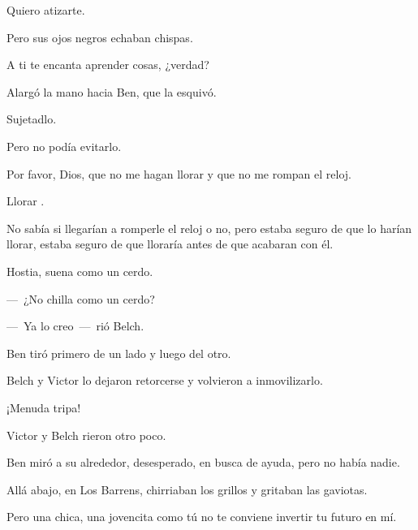 \sk
Quiero atizarte. 

\sk
Pero sus ojos negros echaban chispas.

\sk
A ti te encanta aprender cosas, ¿verdad?

\sk
Alargó la mano hacia Ben, que la esquivó.

\sk
Sujetadlo.

\sk
Pero no podía evitarlo. 

\sk
Por favor, Dios,
que no me hagan llorar y que no me rompan el
reloj.

\sk
Llorar .

\sk
No sabía si
llegarían a romperle el reloj o no, pero estaba
seguro de que lo harían llorar, estaba seguro de
que lloraría  antes de que acabaran con él.

\sk
Hostia, suena como un cerdo. 

\sk
---~¿No chilla como un cerdo?

---~Ya lo creo~---~rió Belch.



\sk
Ben tiró primero de un lado y luego del otro.

\sk
Belch y Victor lo dejaron retorcerse y volvieron a
inmovilizarlo.
\nb{}

\sk
¡Menuda tripa! 

\sk
Victor y Belch rieron otro poco.

\sk
Ben miró a su
alrededor, desesperado, en busca de ayuda, pero
no había nadie.

\sk
Allá abajo, en Los Barrens,
chirriaban los grillos y gritaban las gaviotas.

\sk
Pero una chica, una jovencita como tú no te conviene invertir tu futuro en mí.

